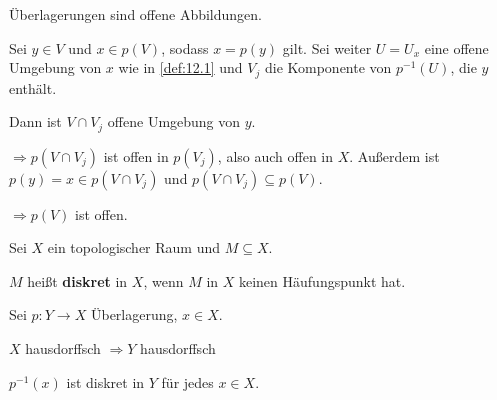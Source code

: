 \begin{bemerkung}\label{bem:12.2} %
    Überlagerungen sind offene Abbildungen.
\end{bemerkung}

\begin{beweis}
    Sei $y \in V$ und $x \in p(V)$, sodass $x=p(y)$ gilt.
    Sei weiter $U = U_x$ eine offene Umgebung von $x$ wie in \cref{def:12.1}
    und $V_j$ die Komponente von $p^{-1}(U)$, die $y$ enthält.

    Dann ist $V \cap V_j$ offene Umgebung von $y$.

    $\Rightarrow p(V \cap V_j)$ ist offen in $p(V_j)$, also auch offen
    in $X$. Außerdem ist $p(y) = x \in p(V \cap V_j)$ und
    $p(V \cap V_j) \subseteq p(V)$.

    $\Rightarrow p(V)$ ist offen.
\end{beweis}

\begin{definition}%
    Sei $X$ ein topologischer Raum und $M \subseteq X$.

    $M$ heißt \textbf{diskret} in $X$, wenn $M$ in $X$ keinen 
    Häufungspunkt hat.
\end{definition}

\begin{bemerkung} %
    Sei $p: Y \rightarrow X$ Überlagerung, $x \in X$.
    \begin{bemenum}
        \item $X$ hausdorffsch $\Rightarrow Y$ hausdorffsch
        \item $p^{-1}(x)$ ist diskret in $Y$ für jedes $x \in X$.
    \end{bemenum}
\end{bemerkung}

